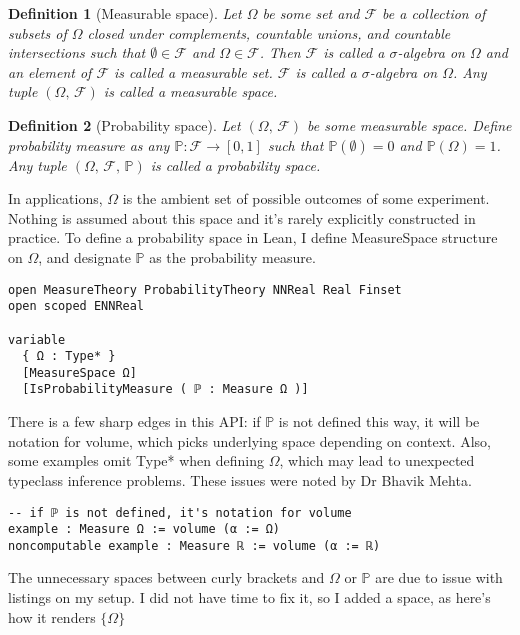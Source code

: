\documentclass[a4paper, 12pt]{article}
\newtheorem{definition}{Definition}
\newcommand{\F}{\mathcal{F}}
\renewcommand{\P}{\mathbb{P}}
\begin{document}
\begin{definition}[Measurable space]
Let $\Omega$ be some set and $\F$ be a collection of subsets of $\Omega$
closed under complements, countable unions, and countable intersections
such that $\emptyset\in\F$ and $\Omega\in\F$.
Then $\F$ is called a $\sigma$-algebra on $\Omega$
and an element of $\F$ is called a measurable set.
$\F$ is called a $\sigma$-algebra on $\Omega$.
Any tuple $(\Omega,\,\F)$ is called a measurable space.
\end{definition}

\begin{definition}[Probability space]
Let $(\Omega,\,\F)$ be some measurable space.
Define probability measure as any $\P \colon \F \rightarrow [0,1]$
such that $\P(\emptyset)=0$ and $\P(\Omega)=1$.
Any tuple $(\Omega,\,\F,\,\P)$ is called a probability space.
\end{definition}

In applications, $\Omega$ is the ambient set of possible outcomes of some experiment.
Nothing is assumed about this space and it's rarely explicitly constructed in practice.
To define a probability space in Lean,
I define MeasureSpace structure on $\Omega$,
and designate $\P$ as the probability measure.

\begin{lstlisting}
open MeasureTheory ProbabilityTheory NNReal Real Finset
open scoped ENNReal

variable
  { Ω : Type* }
  [MeasureSpace Ω]
  [IsProbabilityMeasure ( ℙ : Measure Ω )]
\end{lstlisting}

There is a few sharp edges in this API:
if $\P$ is not defined this way,
it will be notation for volume,
which picks underlying space depending on context.
Also, some examples omit Type* when defining $\Omega$,
which may lead to unexpected typeclass inference problems.
These issues were noted by Dr Bhavik Mehta.

\begin{lstlisting}
-- if ℙ is not defined, it's notation for volume
example : Measure Ω := volume (α := Ω)
noncomputable example : Measure ℝ := volume (α := ℝ)
\end{lstlisting}

The unnecessary spaces between curly brackets and $\Omega$ or $\P$
are due to issue with listings on my setup.
I did not have time to fix it, so I added a space,
as here's how it renders $\{\Omega\}$
\end{document}
